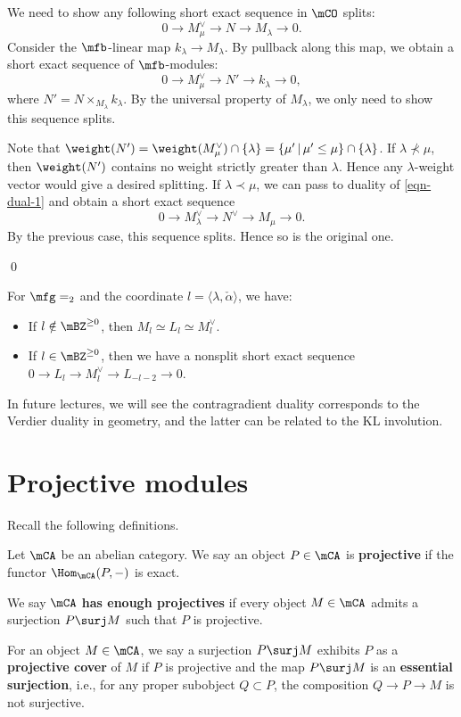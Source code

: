 	\proof
		We need to show any following short exact sequence in $\mCO$ splits:
		\begin{equation}
			\label{eqn-dual-1}
			0 \to M_\mu^\vee \to N \to M_\lambda \to 0.
		\end{equation}
		Consider the $\mfb$-linear map $k_\lambda \to M_\lambda$. By pullback along this map, we obtain a short exact sequence of $\mfb$-modules:
		\[
			0 \to M_\mu^\vee \to N' \to k_\lambda \to 0,
		\]
		where $N' = N \times_{ M_\lambda } k_\lambda$. By the universal property of $M_\lambda$, we only need to show this sequence splits. 

		Note that $\weight(N') = \weight(M_\mu^\vee)\cap \{\lambda\} = \{\mu'\,\vert\, \mu'\le \mu\}\cap \{\lambda\}$. If $\lambda\nprec \mu$, then $\weight(N')$ contains no weight strictly greater than $\lambda$. Hence any $\lambda$-weight vector would give a desired splitting. If $\lambda\prec \mu$, we can pass to duality of \eqref{eqn-dual-1} and obtain a short exact sequence
		\[
			0 \to M_\lambda^\vee \to N^\vee \to M_\mu \to 0.
		\]
		By the previous case, this sequence splits. Hence so is the original one.

	\qed

	\begin{exam}
		For $\mfg = \sl_2$ and the coordinate $l=\langle \lambda,\check\alpha\rangle$, we have:
		\begin{itemize}
			\item 
				If $l\notin \mBZ^{\ge 0}$, then $M_l \simeq L_l \simeq M_l^\vee$.
			\item
				If $l\in \mBZ^{\ge 0}$, then we have a nonsplit short exact sequence $0 \to L_l \to M_l^\vee \to L_{-l-2} \to 0$.
		\end{itemize}
	\end{exam}

	\begin{rem}
		In future lectures, we will see the contragradient duality corresponds to the Verdier duality in geometry, and the latter can be related to the KL involution.
	\end{rem}

\section{Projective modules}
	
	Recall the following definitions.

	\begin{defn}
		Let $\mCA$ be an abelian category. We say an object $P\in \mCA$ is \textbf{projective} if the functor $\Hom_\mCA(P,-)$ is exact.

		We say $\mCA$ \textbf{has enough projectives} if every object $M\in \mCA$ admits a surjection $P\surj M$ such that $P$ is projective.

		For an object $M\in \mCA$, we say a surjection $P\surj M$ exhibits $P$ as a \textbf{projective cover} of $M$ if $P$ is projective and the map $P\surj M$ is an \textbf{essential surjection}, i.e., for any proper subobject $Q\subset P$, the composition $Q\to P \to M$ is not surjective.

	\end{defn}

